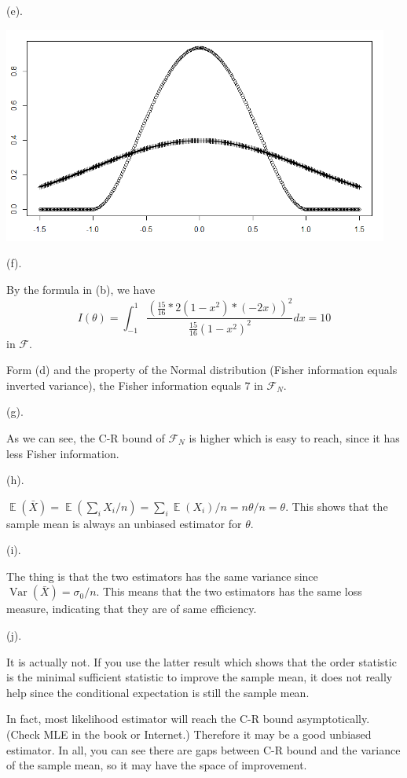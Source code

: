 \documentclass[12pt]{article}
\newcommand{\E}{\operatorname{\mathbb{E}}}
\newcommand{\1}{\mathbbm{1}}
\newcommand{\var}[1]{\operatorname{Var}\left(#1\right)}
\begin{document}
(e).

\includegraphics[width=5in]{1.png}

(f). 

By the formula in (b), we have
$$
I(\theta) =\int_{-1}^1 \frac{(\frac{15}{16} *2(1-x^2)*(-2x))^2}{\frac{15}{16} (1-x^2)^2} dx = 10
$$
in $\mathcal{F}$.

Form (d) and the property of the Normal distribution (Fisher information equals inverted variance), the Fisher information equals $7$ in $\mathcal{F}_N$.

(g).

As we can see, the C-R bound of $\mathcal{F}_N$ is higher which is easy to reach, since it has less Fisher information.

(h).

$\E(\bar{X}) = \E(\sum_i X_i / n) = \sum_i \E (X_i) /n = n\theta / n = \theta$. This shows that the sample mean is always an unbiased estimator for $\theta$.

(i).

The thing is that the two estimators has the same variance since $\var{\bar{X}} = \sigma_0/n$. This means that the two estimators has the same loss measure, indicating that they are of same efficiency.

(j). 

It is actually not. If you use the latter result which shows that the order statistic is the minimal sufficient statistic to improve the sample mean, it does not really help since the conditional expectation is still the sample mean.

In fact, most likelihood estimator will reach the C-R bound asymptotically. (Check MLE in the book or Internet.) Therefore it may be a good unbiased estimator. In all, you can see there are gaps between C-R bound and the variance of the sample mean, so it may have the space of improvement.
\end{document}
